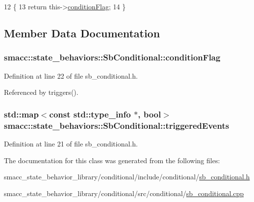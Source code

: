 \begin{DoxyCode}
12 \{
13     \textcolor{keywordflow}{return} this->\hyperlink{classsmacc_1_1state__behaviors_1_1SbConditional_aa998f63dc35b51916a896c62d9e03df1}{conditionFlag};
14 \}
\end{DoxyCode}


\subsection{Member Data Documentation}
\subsubsection[{\texorpdfstring{condition\+Flag}{conditionFlag}}]{ smacc\+::state\+\_\+behaviors\+::\+Sb\+Conditional\+::condition\+Flag\hspace{0.3cm}{\ttfamily [private]}}\hypertarget{classsmacc_1_1state__behaviors_1_1SbConditional_aa998f63dc35b51916a896c62d9e03df1}{}\label{classsmacc_1_1state__behaviors_1_1SbConditional_aa998f63dc35b51916a896c62d9e03df1}


Definition at line 22 of file sb\+\_\+conditional.\+h.



Referenced by triggers().

\subsubsection[{\texorpdfstring{triggered\+Events}{triggeredEvents}}]{\setlength{\rightskip}{0pt plus 5cm}std\+::map$<$const std\+::type\+\_\+info $\ast$, {\bf bool}$>$ smacc\+::state\+\_\+behaviors\+::\+Sb\+Conditional\+::triggered\+Events\hspace{0.3cm}{\ttfamily [private]}}\hypertarget{classsmacc_1_1state__behaviors_1_1SbConditional_ae05538e05b1308e90913fbc358b92e68}{}\label{classsmacc_1_1state__behaviors_1_1SbConditional_ae05538e05b1308e90913fbc358b92e68}


Definition at line 21 of file sb\+\_\+conditional.\+h.



The documentation for this class was generated from the following files\+:\begin{DoxyCompactItemize}
\item 
smacc\+\_\+state\+\_\+behavior\+\_\+library/conditional/include/conditional/\hyperlink{sb__conditional_8h}{sb\+\_\+conditional.\+h}\item 
smacc\+\_\+state\+\_\+behavior\+\_\+library/conditional/src/conditional/\hyperlink{sb__conditional_8cpp}{sb\+\_\+conditional.\+cpp}\end{DoxyCompactItemize}
